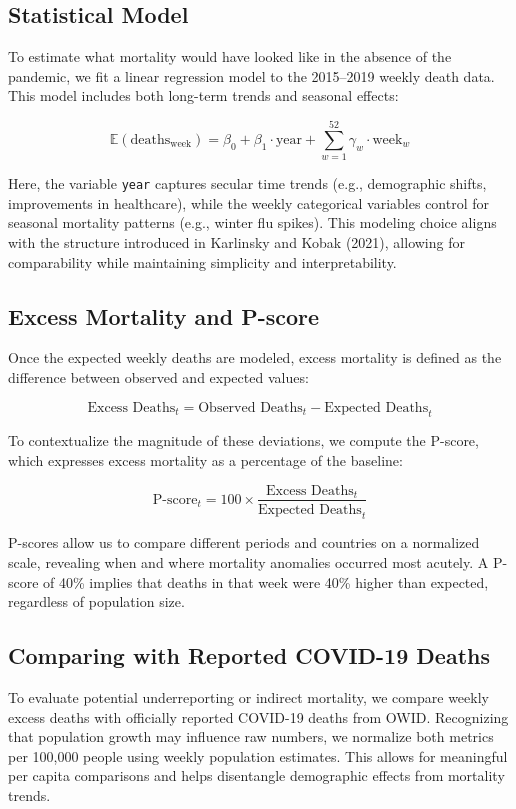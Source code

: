\documentclass[a4paper,11pt]{article}
\begin{document}
\subsection{Statistical Model}

To estimate what mortality would have looked like in the absence of the pandemic, we fit a linear regression model to the 2015–2019 weekly death data. This model includes both long-term trends and seasonal effects:

\[
\mathbb{E}(\text{deaths}_{\text{week}}) = \beta_0 + \beta_1 \cdot \text{year} + \sum_{w=1}^{52} \gamma_w \cdot \text{week}_w
\]

Here, the variable \texttt{year} captures secular time trends (e.g., demographic shifts, improvements in healthcare), while the weekly categorical variables control for seasonal mortality patterns (e.g., winter flu spikes). This modeling choice aligns with the structure introduced in Karlinsky and Kobak (2021), allowing for comparability while maintaining simplicity and interpretability.

\subsection{Excess Mortality and P-score}

Once the expected weekly deaths are modeled, excess mortality is defined as the difference between observed and expected values:

\[
\text{Excess Deaths}_{t} = \text{Observed Deaths}_{t} - \text{Expected Deaths}_{t}
\]

To contextualize the magnitude of these deviations, we compute the P-score, which expresses excess mortality as a percentage of the baseline:

\[
\text{P-score}_{t} = 100 \times \frac{\text{Excess Deaths}_{t}}{\text{Expected Deaths}_{t}}
\]

P-scores allow us to compare different periods and countries on a normalized scale, revealing when and where mortality anomalies occurred most acutely. A P-score of 40\% implies that deaths in that week were 40\% higher than expected, regardless of population size.

\subsection{Comparing with Reported COVID-19 Deaths}

To evaluate potential underreporting or indirect mortality, we compare weekly excess deaths with officially reported COVID-19 deaths from OWID. Recognizing that population growth may influence raw numbers, we normalize both metrics per 100,000 people using weekly population estimates. This allows for meaningful per capita comparisons and helps disentangle demographic effects from mortality trends.
\end{document}
